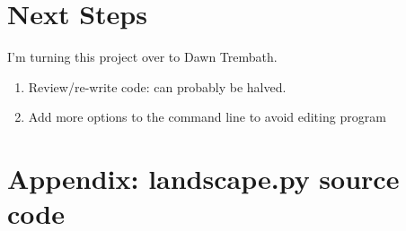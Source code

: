 \documentclass[10pt,letterpaper]{article}
\begin{document}
\section*{Next Steps}

I'm turning this project over to Dawn Trembath.

\begin{enumerate}[itemsep=1pt, topsep=2pt, partopsep=0pt]
\item Review/re-write code: can probably be halved.
\item Add more options to the command line to avoid editing program
\end{enumerate}


{}

\pagebreak

\section{Appendix: landscape.py source code}
\newcommand*{\SrcPath}{..}

\end{document}
